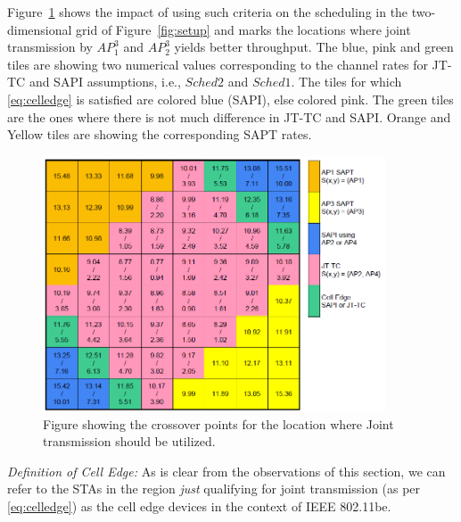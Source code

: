 Figure~\ref{fig:threshold_2d} shows the impact of using such criteria on the scheduling in the two-dimensional grid of Figure~\ref{fig:setup} and marks the locations where joint transmission by $AP_1^3$ and $AP_2^3$ yields better throughput. The blue, pink and green tiles are showing two numerical values corresponding to the channel rates for JT-TC and SAPI assumptions, i.e., $Sched2$ and $Sched1$.
The tiles for which \eqref{eq:celledge} is satisfied are colored blue (SAPI), else colored pink. The green tiles are the ones where there is not much difference in JT-TC and SAPI. Orange and Yellow tiles are showing the corresponding SAPT rates.
%
\begin{figure}[h]
    \begin{center}
        \includegraphics[width=4in]{data1_edited.png}
        \caption{Figure showing the crossover points for the location where Joint transmission should be utilized.}
        \label{fig:threshold_2d}
    \end{center}
\end{figure}


\noindent\emph{Definition of Cell Edge:} As is clear from the observations of this section, we can refer to the STAs in the region \emph{just} qualifying for joint transmission (as per \eqref{eq:celledge}) as the cell edge devices in the context of IEEE 802.11be.

